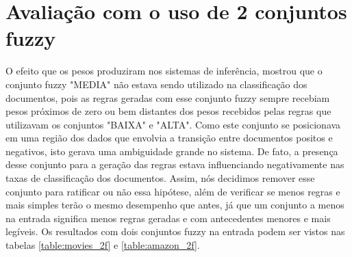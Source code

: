 \documentclass[template.tex]{subfiles}
\begin{document}
\section{Avaliação com o uso de 2 conjuntos fuzzy}


O efeito que os pesos produziram nos sistemas de inferência, mostrou que o conjunto fuzzy "MEDIA" não estava sendo utilizado na classificação dos documentos, pois as regras geradas com esse conjunto fuzzy sempre recebiam pesos próximos de zero ou bem distantes dos pesos recebidos pelas regras que utilizavam os conjuntos "BAIXA" e "ALTA". Como este conjunto se posicionava em uma região dos dados que envolvia a transição entre documentos positos e negativos, isto gerava uma ambiguidade grande no sistema. De fato, a presença desse conjunto para a geração das regras estava influenciando negativamente nas taxas de classificação dos documentos. Assim, nós decidimos remover esse conjunto para ratificar ou não essa hipótese, além de verificar se menos regras e mais simples terão o mesmo desempenho que antes, já que um conjunto a menos na entrada significa menos regras geradas e com antecedentes menores e mais legíveis. Os resultados com dois conjuntos fuzzy na entrada podem ser vistos nas tabelas \ref{table:movies_2f} e \ref{table:amazon_2f}.
\end{document}
